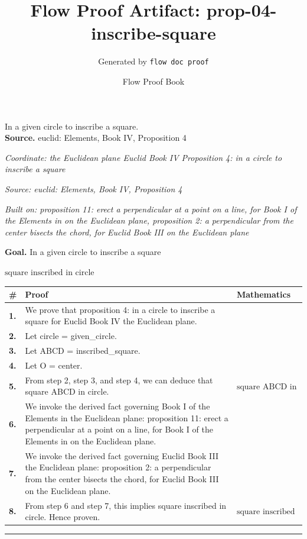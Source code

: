 \documentclass[11pt]{article}
\title{Flow Proof Artifact: prop-04-inscribe-square}
\author{Generated by \texttt{flow doc proof}}
\date{Flow Proof Book}
\theoremstyle{definition}
\begin{document}
\maketitle
In a given circle to inscribe a square.\\[0.5em]
\textbf{Source.} euclid: Elements, Book IV, Proposition 4\\[0.5em]
\bigskip
{}\par
\smallskip\noindent\textit{Coordinate: the Euclidean plane \cdot Euclid Book IV \cdot Proposition 4: in a circle to inscribe a square}\par
\smallskip\noindent\textit{Source: euclid: Elements, Book IV, Proposition 4}\par
\smallskip\noindent\textit{Built on: proposition 11: erect a perpendicular at a point on a line, for Book I of the Elements in on the Euclidean plane, proposition 2: a perpendicular from the center bisects the chord, for Euclid Book III on the Euclidean plane}\par
\medskip
\noindent\textbf{Goal.} In a given circle to inscribe a square\par
\noindent$\displaystyle \text{square inscribed in circle}$\par
\medskip
\noindent
\begin{tabular}{@{} >{\raggedright\arraybackslash}p{} >{\raggedright\arraybackslash}p{} >{\raggedleft\arraybackslash}p{} @{}}
\textbf{\#} & \textbf{Proof} & \textbf{Mathematics} \\
\midrule
\textbf{1.} & We prove that proposition 4: in a circle to inscribe a square for Euclid Book IV the Euclidean plane. & \\[0.45em]
\textbf{2.} & Let circle = given\_circle. & \\[0.45em]
\textbf{3.} & Let ABCD = inscribed\_square. & \\[0.45em]
\textbf{4.} & Let O = center. & \\[0.45em]
\textbf{5.} & From step 2, step 3, and step 4, we can deduce that square ABCD in circle. & $\displaystyle \text{square ABCD in circle}$ \\[0.45em]
\textbf{6.} & We invoke the derived fact governing Book I of the Elements in the Euclidean plane: proposition 11: erect a perpendicular at a point on a line, for Book I of the Elements in on the Euclidean plane. & \\[0.45em]
\textbf{7.} & We invoke the derived fact governing Euclid Book III the Euclidean plane: proposition 2: a perpendicular from the center bisects the chord, for Euclid Book III on the Euclidean plane. & \\[0.45em]
\textbf{8.} & From step 6 and step 7, this implies square inscribed in circle. Hence proven. & $\displaystyle \text{square inscribed in circle}$ \\[0.45em]
\bottomrule
\end{tabular}
\label{thm:Geometry-Euclid Book IV-proposition_4_in_a_circle_to_inscribe_a_square}
\par\medskip\hrule
\end{document}
